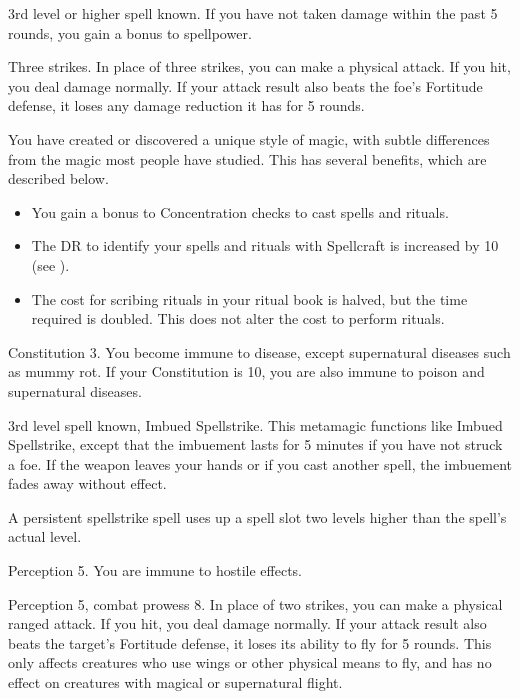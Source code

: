 \featpre 3rd level or higher  spell known.
\featben If you have not taken damage within the past 5 rounds, you gain a  bonus to spellpower.

\featpre Three strikes.
\featben In place of three strikes, you can make a physical attack.
If you hit, you deal damage normally.
If your attack result also beats the foe's Fortitude defense, it loses any damage reduction it has for 5 rounds.

\featben You have created or discovered a unique style of magic, with subtle differences from the magic most people have studied.
This has several benefits, which are described below.
\begin{itemize}
    \item You gain a  bonus to Concentration checks to cast spells and rituals.
    \item The DR to identify your spells and rituals with Spellcraft is increased by 10 (see ).
    \item The cost for scribing rituals in your ritual book is halved, but the time required is doubled.
        This does not alter the cost to perform rituals.
\end{itemize}

\featpre Constitution 3.
\featben You become immune to disease, except supernatural diseases such as mummy rot.
If your Constitution is 10, you are also immune to poison and supernatural diseases.

\featpres 3rd level spell known, Imbued Spellstrike.
\featben This metamagic functions like Imbued Spellstrike, except that the imbuement lasts for 5 minutes if you have not struck a foe.
If the weapon leaves your hands or if you cast another spell, the imbuement fades away without effect.

A persistent spellstrike spell uses up a spell slot two levels higher than the spell's actual level.

\featpre Perception 5.
\featben You are immune to hostile  effects.

\featpre Perception 5, combat prowess 8.
\featben In place of two strikes, you can make a physical ranged attack.
If you hit, you deal damage normally.
If your attack result also beats the target's Fortitude defense, it loses its ability to fly for 5 rounds.
This only affects creatures who use wings or other physical means to fly, and has no effect on creatures with magical or supernatural flight.


